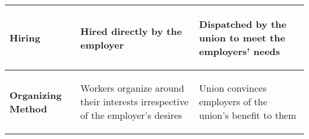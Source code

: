 \begin{table}[!h]
\begin{tabular}{p{30mm}p{87mm}p{87mm}}
\begin{center} \textbf{Hiring} \end{center} &	%
\begin{center}\begin{flushleft} Hired directly by the employer \end{flushleft}\end{center} &	%
\begin{center}\begin{flushleft} Dispatched by the union to meet the employers' needs \end{flushleft}\end{center} \\ %
\midrule

\begin{center}\textbf{Organizing Method}\end{center} &	%
\begin{center}\begin{flushleft}Workers organize around their interests irrespective of the employer's desires \end{flushleft}\end{center} & %
\begin{center}\begin{flushleft}Union convinces employers of the union's benefit to them\end{flushleft}\end{center} \\	%
\midrule


\end{tabular}
\end{table}
